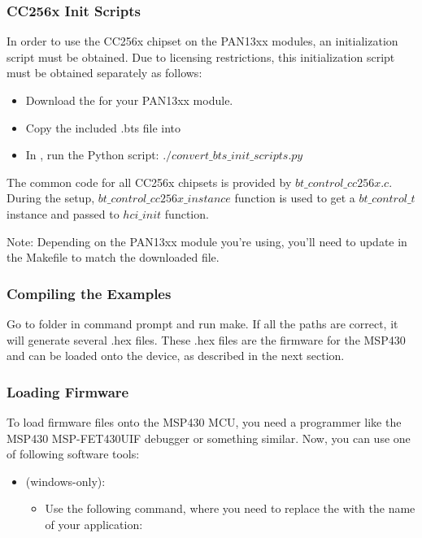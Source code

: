 \subsubsection{CC256x Init Scripts}

In order to use the CC256x chipset on the PAN13xx modules, an initialization script must be obtained. Due to licensing restrictions, this initialization script must be obtained separately as follows:
\begin{itemize}
\item Download the \BTSfile{} for your PAN13xx module.
\item Copy the included .bts file into 
\item In , run the Python script: $./convert\_bts\_init\_scripts.py$
\end{itemize}

The common code for all CC256x chipsets is provided by $bt\_control\_cc256x.c$. During the setup, $bt\_control\_cc256x\_instance$ function is used to get  a $bt\_control\_t$ instance and passed to $hci\_init$ function. 

Note: Depending on the PAN13xx module you're using, you'll need to update  in the Makefile to match the downloaded file.

\subsubsection{Compiling the Examples}

Go to  folder in command prompt and run make. If all the paths are correct, it will generate several .hex files. These .hex files are the firmware for the MSP430 and can be loaded onto the device, as described in the next section.

\subsubsection{Loading Firmware}

To load firmware files onto the MSP430 MCU, you need a programmer like the MSP430 MSP-FET430UIF debugger or something similar. Now, you can use one of following software tools:

 \begin{itemize}
 \item  \MSPFlasher{} (windows-only):
 	\begin{itemize}
 	   \item Use the following command, where you need to replace the  with the name of your application:
	\end{itemize} 
\end{itemize}
	
